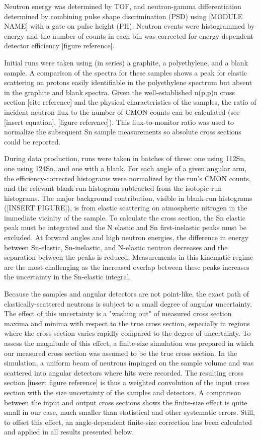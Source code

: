 Neutron energy was determined by TOF, and neutron-gamma differentiation
determined by combining pulse shape discrimination (PSD) using [MODULE NAME] with
a gate on pulse height (PH). Neutron events were histogrammed by energy and the
number of counts in each bin was corrected for energy-dependent detector
efficiency [figure reference].

Initial runs were taken using (in series) a graphite, a polyethylene, and a blank
sample. A comparison of the spectra for these samples shows a peak for elastic
scattering on protons easily identifiable in the polyethylene spectrum but
absent in the graphite and blank spectra. Given the well-established n(p,p)n
cross section [cite reference] and the physical characteristics of the samples,
the ratio of incident neutron flux to the number of CMON counts can be calculated
(see [insert equation], [figure reference]). This flux-to-monitor ratio was used to normalize the
subsequent Sn sample measurements so absolute cross sections could be reported.

During data production, runs were taken in batches of three: one using 112Sn,
one using 124Sn, and one with a blank. For each angle of a given angular arm, the
efficiency-corrected histograms were normalized by the run's CMON counts,
and the relevant blank-run histogram subtracted from the isotopic-run
histograms. The major background contribution, visible in blank-run histograms
([INSERT FIGURE]), is from elastic scattering on atmospheric nitrogen
in the immediate vicinity of the sample. To calculate the cross section, the
Sn elastic peak must be integrated and the N elastic and Sn first-inelastic
peaks must be excluded. At forward angles and high neutron energies, the
difference in energy between Sn-elastic, Sn-inelastic, and N-elastic neutron
decreases and the separation between the peaks is reduced. Measurements in this
kinematic regime are the most challenging as the increased overlap between
these peaks increases the uncertainty in the Sn-elastic integral.

Because the samples and angular detectors are not point-like, the exact
path of elastically-scattered neutrons is subject to a small degree of angular
uncertainty. The effect of this uncertainty is a "washing out" of measured cross
section maxima and minima with respect to the true cross section, especially in
regions where the cross section varies rapidly compared to the degree of
uncertainty. To assess the magnitude of this effect, a finite-size
simulation was prepared in which our measured cross section was assumed
to be the true cross section. In the simulation, a uniform beam of neutrons
impinged on the sample volume and was scattered into angular detectors where
hits were recorded. The resulting cross section [insert figure reference] is
thus a weighted convolution of the input cross section with the size uncertainty
of the samples and detectors. A comparison between the input and output cross
sections shows the finite-size effect is quite small in our case, much smaller
than statistical and other systematic errors. Still, to offset this effect, an
angle-dependent finite-size correction has been calculated and applied in all
results presented below.


